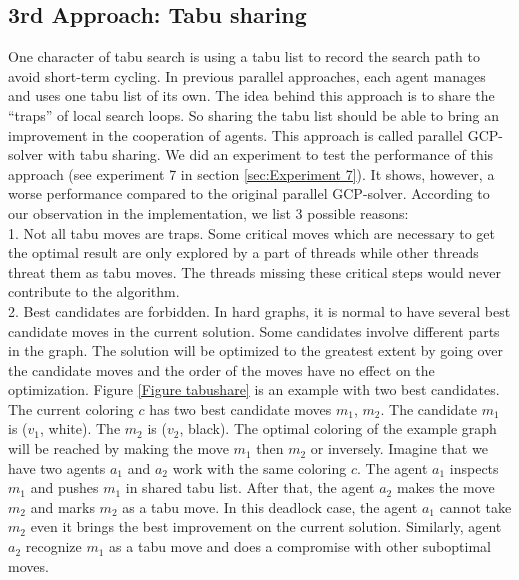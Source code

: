 \documentclass[12pt,a4paper,twoside]{scrartcl}
\numberwithin{equation}{section}
\begin{document}
\subsection{3rd Approach: Tabu sharing}
\label{subsec: tabu sharing}
One character of tabu search is using a tabu list to record the search path to avoid short-term cycling. In previous parallel approaches, each agent manages and uses one tabu list of its own.
The idea behind this approach is to share the ``traps'' of local search loops. So sharing the tabu list should be able  to bring an improvement in the cooperation of agents. This approach is called parallel GCP-solver with tabu sharing.
We did an experiment to test the performance of this approach (see experiment 7 in section \ref{sec:Experiment 7}). It shows, however, a worse performance compared to the original parallel GCP-solver.
According to our observation in the implementation, we list 3 possible reasons:\\
1. Not all tabu moves are traps. Some critical moves which are necessary to get the optimal result are only explored by a part of threads while other threads threat them as tabu moves. The threads missing these critical steps would never contribute to the algorithm.\\
2. Best candidates are forbidden. In hard graphs, it is normal to have several best candidate moves in the current solution. Some candidates involve different parts in the graph. The solution will be optimized to the greatest extent by going over the candidate moves and the order of the moves have no effect on the optimization. Figure \ref{Figure tabushare} is an example with two best candidates.  The current coloring $c$ has two best candidate moves $m_1$, $m_2$. The candidate  $m_1$ is ($v_1$, white). The $m_2$ is ($v_2$, black). The optimal coloring of the example graph will be reached by making the move $m_1$ then $m_2$ or inversely. Imagine that we have two agents  $a_1$ and  $a_2$ work with the same coloring $c$. The agent $a_1$ inspects $m_1$ and pushes $m_1$ in shared tabu list. After that, the agent $a_2$ makes the move $m_2$ and marks $m_2$ as a tabu move. In this deadlock case, the agent $a_1$ cannot take $m_2$ even it brings the best improvement on the current solution. Similarly, agent $a_2$ recognize $m_1$ as a tabu move and does a compromise with other suboptimal moves.
\end{document}
